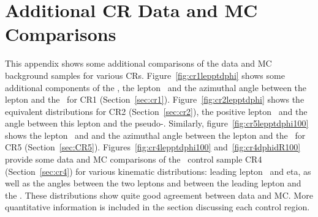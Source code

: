 \section{Additional CR Data and MC Comparisons} 
\label{app:ttdlnj}

This appendix shows some additional comparisons of the data and MC background samples
for various CRs. Figure~\ref{fig:cr1lepptdphi} shows some
additional components of the \mt, the lepton \pt\ and the
azimuthal angle between the lepton and the \met\ for CR1
(Section~\ref{sec:cr1}). Figure~\ref{fig:cr2lepptdphi} shows the
equivalent distributions for CR2 (Section~\ref{sec:cr2}), the positive lepton \pt\ and the
angle between this lepton and the
pseudo-\met. Similarly, figure~\ref{fig:cr5lepptdphi100} shows the lepton
\pt\ and and the azimuthal angle between the lepton and the \met\ for CR5
(Section~\ref{sec:CR5}). Figures~\ref{fig:cr4lepptdphi100}
and~\ref{fig:cr4dphidR100} provide some data and MC comparisons of the
\ttdl\ control sample CR4 (Section~\ref{sec:cr4}) for various
kinematic distributions: leading lepton \pt\ and eta, as well as the
angles between the two leptons and between the leading lepton and the
\met. These distributions show quite good agreement between data and
MC. More quantitative information is included in the section discussing each
control region.

